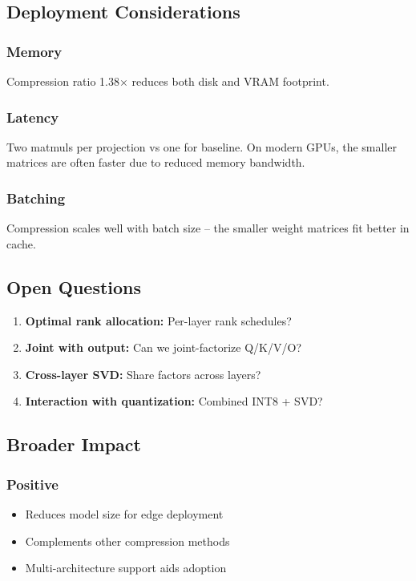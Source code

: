 \subsection{Deployment Considerations}

\subsubsection{Memory}

Compression ratio 1.38$\times$ reduces both disk and VRAM footprint.

\subsubsection{Latency}

Two matmuls per projection vs one for baseline. On modern GPUs, the smaller 
matrices are often faster due to reduced memory bandwidth.

\subsubsection{Batching}

Compression scales well with batch size -- the smaller weight matrices fit 
better in cache.

\subsection{Open Questions}

\begin{enumerate}
\item \textbf{Optimal rank allocation:} Per-layer rank schedules?
\item \textbf{Joint with output:} Can we joint-factorize Q/K/V/O?
\item \textbf{Cross-layer SVD:} Share factors across layers?
\item \textbf{Interaction with quantization:} Combined INT8 + SVD?

\end{enumerate}
\subsection{Broader Impact}

\subsubsection{Positive}
\begin{itemize}
\item Reduces model size for edge deployment
\item Complements other compression methods
\item Multi-architecture support aids adoption

\end{itemize}
